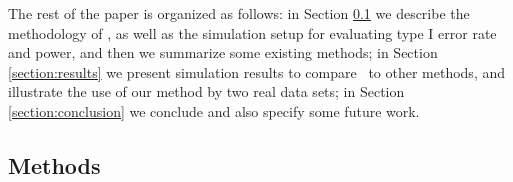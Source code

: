 	The rest of the paper is organized as follows: in Section \ref{section:methods} we describe the
	methodology of \OurMethod, as well as the simulation setup for evaluating type I error rate and 
	power, and then we summarize some existing methods; in
	Section \ref{section:results} we present simulation results to compare \OurMethod~to other 
	methods, and illustrate the use of our method by two real data 
	sets; in Section \ref{section:conclusion} we conclude and also specify some future work.
	
		
	
	\subsection{Methods}\label{section:methods}
		
